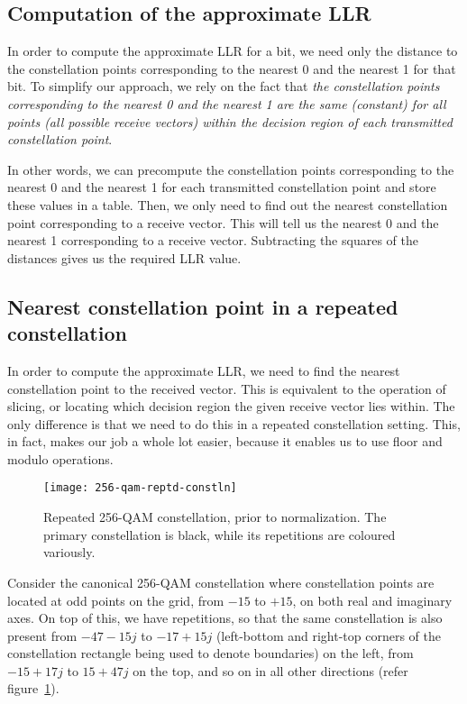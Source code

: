 \subsection{Computation of the approximate LLR}

In order to compute the approximate LLR for a bit, we need only the distance to
the constellation points corresponding to the nearest 0 and the nearest 1 for
that bit. To simplify our approach, we rely on the fact that \emph{the
constellation points corresponding to the nearest 0 and the nearest 1 are the
same (constant) for all points (all possible receive vectors) within the
decision region of each transmitted constellation point}.

In other words, we can precompute the constellation points corresponding to the
nearest 0 and the nearest 1 for each transmitted constellation point and store
these values in a table.  Then, we only need to find out the nearest
constellation point corresponding to a receive vector. This will tell us the
nearest 0 and the nearest 1 corresponding to a receive vector. Subtracting the
squares of the distances gives us the required LLR value.

\subsection{Nearest constellation point in a repeated constellation}

In order to compute the approximate LLR, we need to find the nearest
constellation point to the received vector. This is equivalent to the operation
of slicing, or locating which decision region the given receive vector lies
within. The only difference is that we need to do this in a repeated
constellation setting. This, in fact, makes our job a whole lot easier, because
it enables us to use floor and modulo operations.

\begin{figure}[h]
	\centering
	\texttt{[image: 256-qam-reptd-constln]}
	\caption{Repeated 256-QAM constellation, prior to normalization. The
	         primary constellation is black, while its repetitions are coloured
	         variously.}
	\label{fig:256-qam-reptd}
\end{figure}

Consider the canonical 256-QAM constellation where constellation points are
located at odd points on the grid, from $-15$ to $+15$, on both real and
imaginary axes. On top of this, we have repetitions, so that the same
constellation is also present from $-47-15j$ to $-17+15j$ (left-bottom and
right-top corners of the constellation rectangle being used to denote
boundaries) on the left, from $-15+17j$ to $15+47j$ on the top, and so on in
all other directions (refer figure~\ref{fig:256-qam-reptd}).

